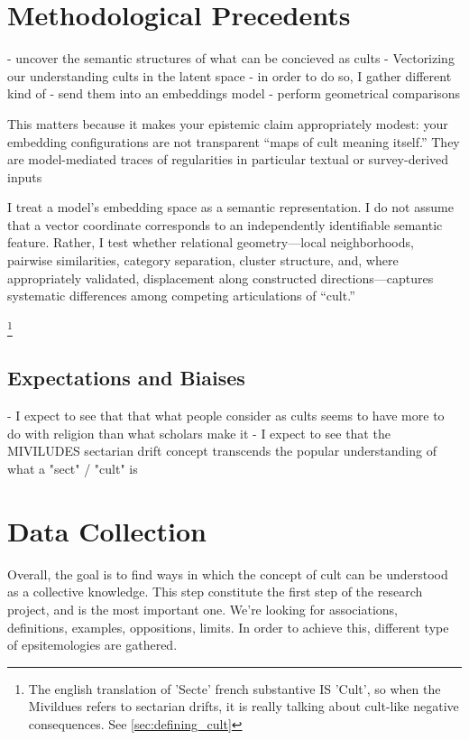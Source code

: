 \section{Methodological Precedents}


- uncover the semantic structures of what can be concieved as cults
- Vectorizing our understanding cults in the latent space
- in order to do so, I gather different kind of 
- send them into an embeddings model
- perform geometrical comparisons

This matters because it makes your epistemic claim appropriately modest: your embedding configurations are not transparent “maps of cult meaning itself.” They are model-mediated traces of regularities in particular textual or survey-derived inputs

I treat a model’s embedding space as a semantic representation. I do not assume that a vector coordinate corresponds to an independently identifiable semantic feature. Rather, I test whether relational geometry—local neighborhoods, pairwise similarities, category separation, cluster structure, and, where appropriately validated, displacement along constructed directions—captures systematic differences among competing articulations of “cult.”



\footnote{
		The english translation of 'Secte' french substantive IS 'Cult', so when the Mivildues refers to sectarian drifts, it is really talking about cult-like negative consequences. See \ref{sec:defining_cult}
	}



\subsection{Expectations and Biaises}
- I expect to see that that what people consider as cults seems to have more to do with religion than what scholars make it
- I expect to see that the MIVILUDES sectarian drift concept transcends the popular understanding of what a "sect" / "cult" is

\section{Data Collection}

Overall, the goal is to find ways in which the concept of cult can be understood as a collective knowledge. This step constitute the first step of the research project, and is the most important one.
We're looking for associations, definitions, examples, oppositions, limits. In order to achieve this, different type of epsitemologies are gathered.
